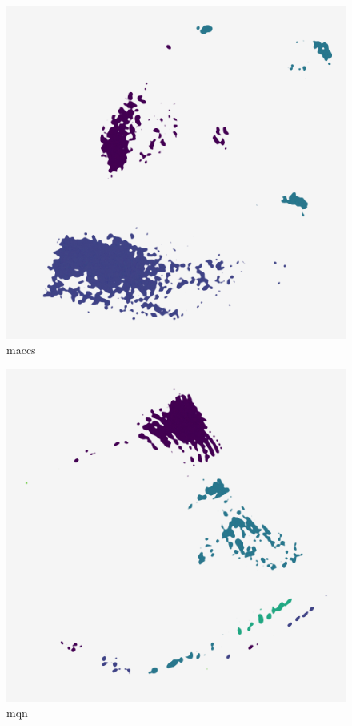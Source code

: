 \begin{subfigure}[b]{.25\linewidth}
    \centering
    \includegraphics[width=\textwidth]{outputs/DRplots/plots/AE_maccs.png}
    \caption{maccs}
    \label{fig:AE_maccs}
\end{subfigure}
\begin{subfigure}[b]{.25\linewidth}
    \centering
    \includegraphics[width=\textwidth]{outputs/DRplots/plots/AE_mqn.png}
    \caption{mqn}
    \label{fig:AE_mqn}
\end{subfigure}
